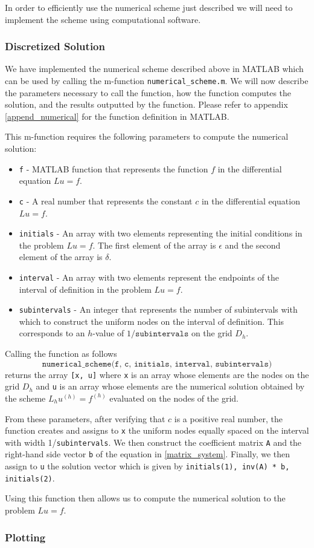 In order to efficiently use the numerical scheme just described we will need to
implement the scheme using computational software.

\subsubsection{Discretized Solution}
We have implemented the numerical scheme described above in MATLAB which can be
used by calling the m-function \texttt{numerical\_scheme.m}. We will now
describe the parameters necessary to call the function, how the function
computes the solution, and the results outputted by the function. Please refer
to appendix \ref{append_numerical} for the function definition in MATLAB.

This m-function requires the following parameters to compute the numerical solution:
\begin{itemize}
  \item \texttt{f} - MATLAB function that represents the function $f$ in the differential equation $Lu = f$.
  \item \texttt{c} - A real number that represents the constant $c$ in the differential equation $Lu = f$.
  \item \texttt{initials} - An array with two elements representing the initial conditions in the problem
    $Lu=f$. The first element of the array is $\epsilon$ and the second element of the array is $\delta$.
  \item \texttt{interval} - An array with two elements represent the endpoints of the interval of definition in
    the problem $Lu = f$.
  \item \texttt{subintervals} - An integer that represents the number of subintervals with which to construct
    the uniform nodes on the interval of definition. This corresponds to an
    $h$-value of $1/\texttt{subintervals}$ on the grid $D_h$.
\end{itemize}

Calling the function as follows
\[
  \texttt{numerical\_scheme(f, c, initials, interval, subintervals)}
\]
returns the array \texttt{[x, u]} where \texttt{x} is an array whose elements are
the nodes on the grid $D_h$ and \texttt{u} is an array whose elements are the
numerical solution obtained by the scheme $L_h u^{(h)} = f^{(h)}$ evaluated on the
nodes of the grid.

From these parameters, after verifying that $c$ is a positive real number,
the function creates and assigns to \texttt{x} the uniform
nodes equally spaced on the interval with width 1/\texttt{subintervals}. We then
construct the  coefficient matrix \texttt{A} and the right-hand side vector \texttt{b} of the equation
in \eqref{matrix_system}. Finally, we then assign to \texttt{u} the solution vector
which is given by \texttt{initials(1), inv(A) * b, initials(2)}.

Using this function then allows us to compute the numerical solution to the problem
$Lu = f$.
\subsubsection{Plotting}
